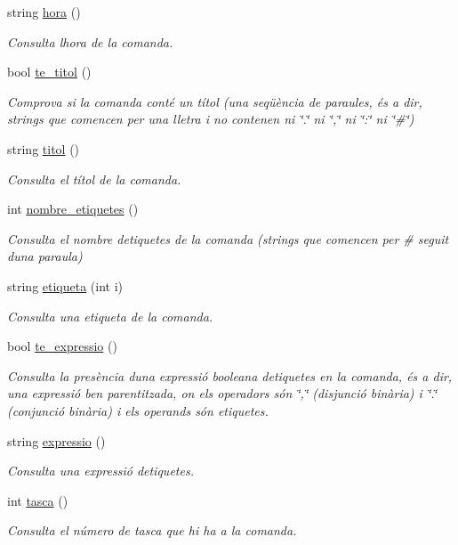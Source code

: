 \begin{DoxyCompactItemize}
string \hyperlink{class_comanda_ae8bca2ad702d3316dc1c53dcab7cac02}{hora} ()
\begin{DoxyCompactList}\small\item\em Consulta l\textquotesingle{}hora de la comanda. \end{DoxyCompactList}\item 
bool \hyperlink{class_comanda_a5452f5a877d58627cd2bd871cf31b074}{te\+\_\+titol} ()
\begin{DoxyCompactList}\small\item\em Comprova si la comanda conté un títol (una seqüència de paraules, és a dir, strings que comencen per una lletra i no contenen ni \char`\"{}.\char`\"{} ni \char`\"{},\char`\"{} ni \char`\"{}\+:\char`\"{} ni \char`\"{}\#\char`\"{}) \end{DoxyCompactList}\item 
string \hyperlink{class_comanda_ad1cefdda3db389d9ab536a59e2ee907d}{titol} ()
\begin{DoxyCompactList}\small\item\em Consulta el títol de la comanda. \end{DoxyCompactList}\item 
int \hyperlink{class_comanda_a4280b6ae2d435d9c21bbed364cb1db3d}{nombre\+\_\+etiquetes} ()
\begin{DoxyCompactList}\small\item\em Consulta el nombre d\textquotesingle{}etiquetes de la comanda (strings que comencen per \# seguit d\textquotesingle{}una paraula) \end{DoxyCompactList}\item 
string \hyperlink{class_comanda_ac80e9a80d16c6bac9a134e431bca1ed0}{etiqueta} (int i)
\begin{DoxyCompactList}\small\item\em Consulta una etiqueta de la comanda. \end{DoxyCompactList}\item 
bool \hyperlink{class_comanda_a81d17f4233e33f3baac7633546c066f0}{te\+\_\+expressio} ()
\begin{DoxyCompactList}\small\item\em Consulta la presència d\textquotesingle{}una expressió booleana d\textquotesingle{}etiquetes en la comanda, és a dir, una expressió ben parentitzada, on els operadors són \char`\"{},\char`\"{} (disjunció binària) i \char`\"{}.\char`\"{} (conjunció binària) i els operands són etiquetes. \end{DoxyCompactList}\item 
string \hyperlink{class_comanda_aa3191131592fbf58d20bed1052c31cd1}{expressio} ()
\begin{DoxyCompactList}\small\item\em Consulta una expressió d\textquotesingle{}etiquetes. \end{DoxyCompactList}\item 
int \hyperlink{class_comanda_a67591051e9c5977c324ad8f8c3ac16e3}{tasca} ()
\begin{DoxyCompactList}\small\item\em Consulta el número de tasca que hi ha a la comanda. \end{DoxyCompactList}\end{DoxyCompactItemize}
